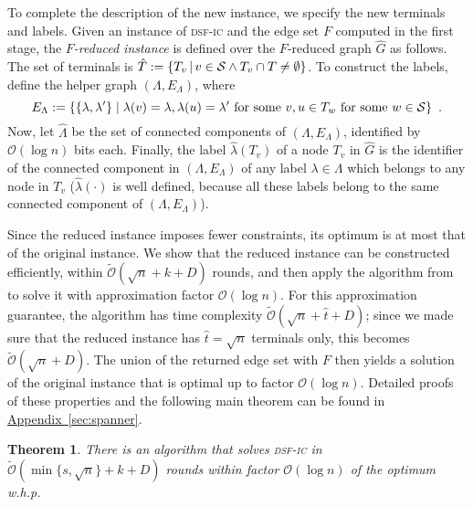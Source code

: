 \documentclass[letterpaper,11pt]{article}
\newtheorem{theorem}{Theorem}[section]
\newcommand{\namedref}[2]{\hyperref[#2]{#1~\ref*{#2}}}
\newcommand{\appendixref}[1]{\namedref{Appendix}{#1}}
\newcommand{\BO}{\mathcal{O}}
\newcommand{\sO}{\tilde{\mathcal{O}}}
\newcommand{\Comp}{\lambda}
\newcommand{\Set}[1]{\left\{#1\right\}}
\newcommand{\sfic}{\textsc{dsf-ic}\xspace}
\begin{document}
To complete the description of the new instance, we specify the new terminals
and labels.
Given an instance of \sfic and the edge set $F$ computed in the first
stage, the \emph{$F$-reduced instance} is defined over the 
$F$-reduced graph $\hat{G}$ as follows. The set of terminals is 
$\hat{T}:=\{T_v\,|\,v\in {\cal S}\wedge T_v\cap T\neq \emptyset\}$. To
construct the labels, define the helper graph $(\Lambda,E_{\Lambda})$,
where 
$$E_{\Lambda}:=\Set{\Set{\Comp,\Comp'}\mid
  \Comp(v)=\Comp,\Comp(u)=\Comp'\text{ for some }v,u\in T_w\text{ for
some }w\in{\cal S}}~.$$  
Now, let
$\hat{\Lambda}$ be the set of connected components of
$(\Lambda,E_{\Lambda})$, identified by  $\BO(\log n)$ bits
each. Finally, the
label $\hat\Comp(T_v)$ of a node $T_v$ in $\hat G$ is the identifier of the
connected component in $(\Lambda,E_{\Lambda})$ of any label $\Comp\in \Lambda$
which belongs to any node in $T_v$ ($\hat{\Comp}(\cdot)$ is well defined,
because all these labels belong to the same connected component of
$(\Lambda,E_{\Lambda})$). 

Since the reduced instance imposes fewer constraints, its optimum is at most
that of the original instance. We show that the reduced instance can be
constructed efficiently, within $\sO(\sqrt{n}+k+D)$ rounds, and then apply the
algorithm from~\cite{LenzenP13} to solve it with approximation factor $\BO(\log
n)$. For this approximation guarantee, the algorithm has time complexity
$\sO(\sqrt{n}+\hat{t}+D)$; since we made sure that the reduced instance has
$\hat{t}=\sqrt{n}$ terminals only, this becomes $\sO(\sqrt{n}+D)$.
The union of the returned edge set with $F$ then yields a solution of the
original instance that is optimal up to factor $\BO(\log n)$. Detailed proofs of
these properties and the following main theorem can be found in
\appendixref{sec:spanner}.
\begin{theorem}\label{theorem:fast}
There is an algorithm that solves \sfic in $\tilde{\BO}(\min\{s,\sqrt{n}\}+k+D)$
rounds within factor $\BO(\log n)$ of the optimum w.h.p.
\end{theorem}

\newpage
\end{document}
